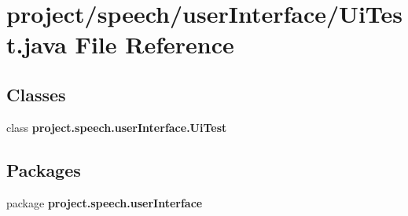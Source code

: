 \section{project/speech/user\+Interface/\+Ui\+Test.java File Reference}
\label{_ui_test_8java}
\subsection*{Classes}
\begin{DoxyCompactItemize}
\item 
class {\bf project.\+speech.\+user\+Interface.\+Ui\+Test}
\end{DoxyCompactItemize}
\subsection*{Packages}
\begin{DoxyCompactItemize}
\item 
package {\bf project.\+speech.\+user\+Interface}
\end{DoxyCompactItemize}
